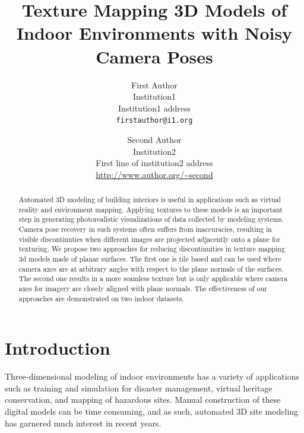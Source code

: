 \documentclass[10pt,twocolumn,letterpaper]{article}
\begin{document}
\title{Texture Mapping 3D Models of Indoor Environments with Noisy
  Camera Poses}

\author{First Author\\
  Institution1\\
  Institution1 address\\
  {\tt\small firstauthor@i1.org}
  \and
  Second Author\\
  Institution2\\
  First line of institution2 address\\
  {\small\url{http://www.author.org/~second}} }

\maketitle

\begin{abstract}
  Automated 3D modeling of building interiors is useful in
  applications such as virtual reality and environment
  mapping. Applying textures to these models is an important step in
  generating photorealistic visualizations of data collected by
  modeling systems.  Camera pose recovery in such systems often
  suffers from inaccuracies, resulting in visible discontinuties when
  different images are projected adjacently onto a plane for
  texturing. We propose two approaches for reducing discontinuities in
  texture mapping 3d models made of planar surfaces. The first one is
  tile based and can be used where camera axes are at arbitrary angles
  with respect to the plane normals of the surfaces. The second one
  results in a more seamless texture but is only applicable where
  camera axes for imagery are closely aligned with plane normals. The
  effectiveness of our approaches are demonstrated on two indoor
  datasets.
\end{abstract}

\section{Introduction}
\label{sec:introduction}
Three-dimensional modeling of indoor environments has a variety of
applications such as training and simulation for disaster management,
virtual heritage conservation, and mapping of hazardous sites. Manual
construction of these digital models can be time consuming, and as
such, automated 3D site modeling has garnered much interest in recent
years.
\end{document}
